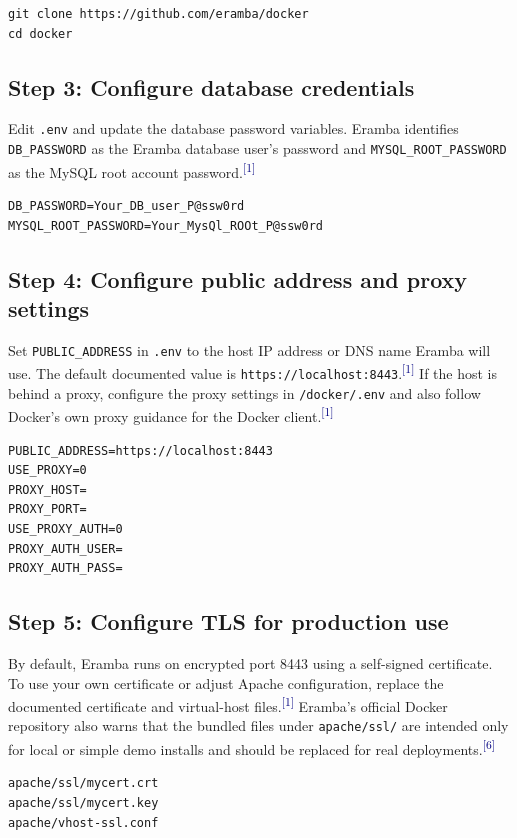 \documentclass[10pt,letterpaper]{article}
\newcommand{\source}[1]{\textsuperscript{\textcolor{navy}{#1}}}
\begin{document}
\begin{verbatim}
git clone https://github.com/eramba/docker
cd docker
\end{verbatim}

\subsection{Step 3: Configure database credentials}
Edit \texttt{.env} and update the database password variables. Eramba identifies \texttt{DB\_PASSWORD} as the Eramba database user's password and \texttt{MYSQL\_ROOT\_PASSWORD} as the MySQL root account password.\source{[1]}

\begin{verbatim}
DB_PASSWORD=Your_DB_user_P@ssw0rd
MYSQL_ROOT_PASSWORD=Your_MysQl_ROOt_P@ssw0rd
\end{verbatim}

\subsection{Step 4: Configure public address and proxy settings}
Set \texttt{PUBLIC\_ADDRESS} in \texttt{.env} to the host IP address or DNS name Eramba will use. The default documented value is \texttt{https://localhost:8443}.\source{[1]} If the host is behind a proxy, configure the proxy settings in \texttt{/docker/.env} and also follow Docker's own proxy guidance for the Docker client.\source{[1]}

\begin{verbatim}
PUBLIC_ADDRESS=https://localhost:8443
USE_PROXY=0
PROXY_HOST=
PROXY_PORT=
USE_PROXY_AUTH=0
PROXY_AUTH_USER=
PROXY_AUTH_PASS=
\end{verbatim}

\subsection{Step 5: Configure TLS for production use}
By default, Eramba runs on encrypted port 8443 using a self-signed certificate. To use your own certificate or adjust Apache configuration, replace the documented certificate and virtual-host files.\source{[1]} Eramba's official Docker repository also warns that the bundled files under \texttt{apache/ssl/} are intended only for local or simple demo installs and should be replaced for real deployments.\source{[6]}

\begin{verbatim}
apache/ssl/mycert.crt
apache/ssl/mycert.key
apache/vhost-ssl.conf
\end{verbatim}
\end{document}
